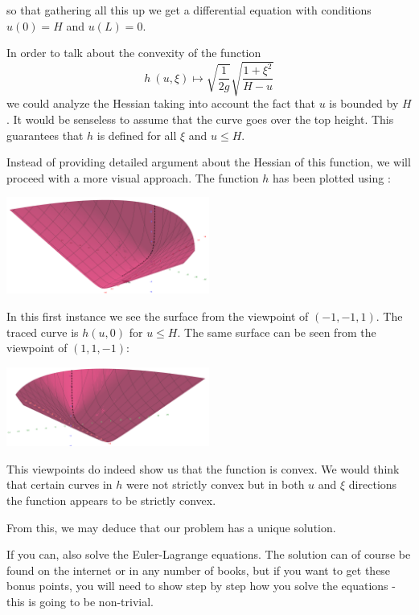 \documentclass[12pt]{memoir}
\begin{document}
\begin{ptcbr}
so that gathering all this up we get a differential equation with conditions $u(0)=H$ and $u(L)=0$.\par 
In order to talk about the convexity of the function 
$$h\: (u,\xi)\mapsto \sqrt{\frac{1}{2g}}\sqrt{\frac{1+\xi^2}{H-u}}$$
we could analyze the Hessian taking into account the fact that $u$ is bounded by $H$. It would be senseless to assume that the curve goes over the top height. This guarantees that $h$ is defined for all $\xi$ and $u\leq H$.\par
Instead of providing detailed argument about the Hessian of this function, we will proceed with a more visual approach. The function $h$ has been plotted using :
\begin{center}
    \includegraphics[width=0.5\textwidth]{fig1HW3Vari.png}    
\end{center}
In this first instance we see the surface from the viewpoint of $(-1,-1,1)$. The traced curve is $h(u,0)$ for $u\leq H$. The same surface can be seen from the viewpoint of $(1,1,-1)$:
\begin{center}
    \includegraphics[width=0.5\textwidth]{fig2HW3Vari.png}    
\end{center}
This viewpoints do indeed show us that the function is convex. We would think that certain curves in $h$ were not strictly convex but in both $u$ and $\xi$ directions the function appears to be strictly convex.\par 
From this, we may deduce that our problem has a unique solution.
\end{ptcbr}

\begin{nonum-Ej}
    If you can, also solve the Euler-Lagrange equations. The solution can of course be found on the internet
or in any number of books, but if you want to get these bonus points, you will need to show step by step
how you solve the equations - this is going to be non-trivial.
\end{nonum-Ej}
\end{document}
